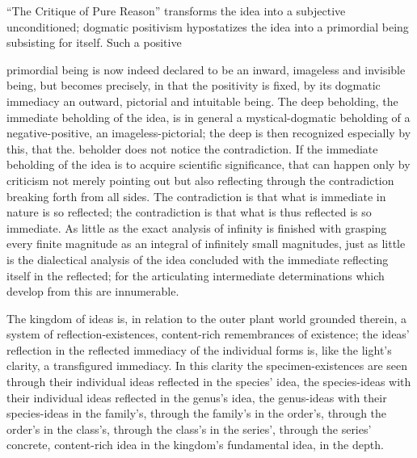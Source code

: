 \documentclass[12pt,a4paper]{book}
\begin{document}
``The Critique of Pure Reason'' transforms the idea into a subjective
unconditioned; dogmatic positivism hypostatizes the idea into a primordial being
subsisting for itself. Such a positive

primordial being is now indeed declared to be an inward, imageless and invisible
being, but becomes precisely, in that the positivity is fixed, by its dogmatic
immediacy an outward, pictorial and intuitable being. The deep beholding, the
immediate beholding of the idea, is in general a mystical-dogmatic beholding of a
negative-positive, an imageless-pictorial; the deep is then recognized especially
by this, that the. beholder does not notice the contradiction.
If the immediate beholding of the idea is to acquire scientific significance, that
can happen only by criticism not merely pointing out but also reflecting through
the contradiction breaking forth from all sides. The contradiction is that what is
immediate in nature is so reflected; the contradiction is that what is thus
reflected is so immediate. As little as the exact analysis of infinity is finished
with grasping every finite magnitude as an integral of infinitely small magnitudes,
just as little is the dialectical analysis of the idea concluded with the immediate
reflecting itself in the reflected; for the articulating intermediate determinations
which develop from this are innumerable.

The kingdom of ideas is, in relation to the outer plant world grounded therein, a
system of reflection-existences, content-rich remembrances of existence; the ideas'
reflection in the reflected immediacy of the individual forms is, like the light's
clarity, a transfigured immediacy. In this clarity the specimen-existences are seen
through their individual ideas reflected in the species' idea, the species-ideas
with their individual ideas reflected in the genus's idea, the genus-ideas with
their species-ideas in the family's, through the family's in the order's, through
the order's in the class's, through the class's in the series', through the series'
concrete, content-rich idea in the kingdom's fundamental idea, in the depth.
\end{document}
